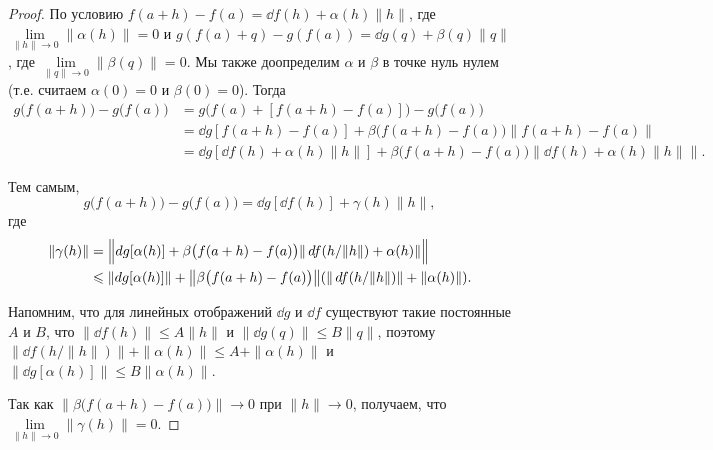\documentclass[a4paper]{article}
\theoremstyle{named}
\begin{document}
    \begin{proof}
        По условию
        $f(a+h)-f(a) = \dd f(h) + \alpha(h)\|h\|$, где $\lim\limits_{\|h\|\to0}\|\alpha(h)\|=0$
        и $g(f(a)+q) - g(f(a)) = \dd g(q)+\beta(q)\|q\|$, где $\lim\limits_{\|q\|\to0}\|\beta(q)\|=0$.
        Мы также доопределим $\alpha$ и $\beta$ в точке нуль нулем (т.е. считаем $\alpha(0)=0$ и $\beta(0)=0$).
        Тогда
        \begin{align*}
            g\bigl(f(a+h)\bigr) - g\bigl(f(a)\bigr) 
            &= g\bigl(f(a) + [f(a+h)-f(a)]\bigr) - g\bigl(f(a)\bigr) \\
            &= \dd g[f(a+h)-f(a)] + \beta\bigl(f(a+h)-f(a)\bigr)\|f(a+h)-f(a)\| \\
            &= \dd g[\dd f(h) + \alpha(h)\|h\|] + \beta\bigl(f(a+h)-f(a)\bigr)\|\dd f(h) + \alpha(h)\|h\|\|.
        \end{align*}

        Тем самым,
        $$
            g\bigl(f(a+h)\bigr) - g\bigl(f(a)\bigr) = \dd g[\dd f(h)] + \gamma(h)\|h\|,
        $$
        где
        \begin{align*}
            \|\gamma(h)\|
            &= \Bigl\|dg[\alpha(h)] +  \beta\bigl(f(a+h)-f(a)\bigr)\|\mathop{}\!d f(h/\|h\|) + \alpha(h)\| \Bigr\| \\
            &\leqslant \|dg[\alpha(h)]\| + \bigl\|\beta\bigl(f(a+h)-f(a)\bigr)\bigr\| (\|\mathop{}\!d f(h/\|h\|)\| + \|\alpha(h)\|).
        \end{align*}

        Напомним, что для линейных отображений $\dd g$ и $\dd f$ существуют такие постоянные $A$ и $B$, что
        $\|\dd f(h)\|\leq A\|h\|$ и $\|\dd g(q)\|\leq B\|q\|$,
        поэтому $\|\dd f(h/\|h\|)\| + \|\alpha(h)\|\leq A + \|\alpha(h)\|$ и $\|\dd g[\alpha(h)]\|\leq B\|\alpha(h)\|$.

        Так как $\bigl\|\beta\bigl(f(a+h)-f(a)\bigr)\bigr\|\to0$ при $\|h\|\to 0$, получаем, что $\lim\limits_{\|h\|\to0}\|\gamma(h)\|=0$.
    \end{proof}
\end{document}
